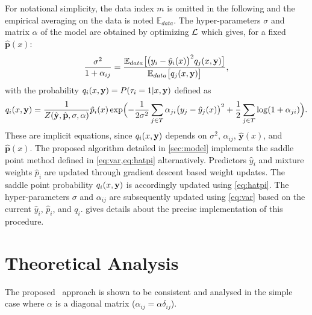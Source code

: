 For notational simplicity, the data index $m$ is omitted in the following and the empirical 
averaging on the data is noted ${\mathbb E}_{data}$. The hyper-parameters $\sigma$ and matrix 
$\alpha$ of the model are obtained by optimizing ${\cal L}$ which gives, for a fixed 
$\hat{\mathbf{p}}(x)$:
%
\begin{equation}\label{eq:var}
  \frac{\sigma^2}{1+\alpha_{ij}} = 
  \frac{
    {\mathbb E}_{data}\bigl[\bigl(y_i-\hat y_i(x)\bigr)^2q_j(x,{\bf y})\bigr]
  }{
    {\mathbb E}_{data}\bigl[q_j(x,{\bf y})\bigr]
  },
\end{equation}
%
with the probability $q_i(x,{\bf y}) = P(\tau_i=1\vert x,{\bf y})$ defined as
%
\begin{equation}\label{eq:hatpi}
  q_i(x,{\bf y}) = \frac{1}{
    Z(\hat {\bf y},\hat{\bf p},\sigma,{\bf \alpha})
  } \hat p_i(x) 
  \exp\Bigl(
    - \frac{1}{2\sigma^2}\sum_{j\in T}\alpha_{ji}\bigl(y_j-\hat y_j(x)\bigr)^2 
    + \frac{1}{2}\sum_{j\in T}\log(1+\alpha_{ji})
  \Bigr).
\end{equation}
%
%
These are implicit equations, since $q_i(x,{\bf y})$ depends on $\sigma^2$, $\alpha_{ij}$, 
$\hat{\mathbf{y}}(x)$, and $\hat{\mathbf{p}}(x)$. The proposed algorithm detailed 
in \cref{sec:model} implements the saddle point method defined in \cref{eq:var,eq:hatpi} 
alternatively. Predictors $\hat y_i$ and mixture weights $\hat p_i$ are updated through 
gradient descent based weight updates. The saddle point probability $q_i(x,{\bf y})$ is accordingly 
updated using \cref{eq:hatpi}. The hyper-parameters $\sigma$ and $\alpha_{ij}$ are subsequently 
updated using \cref{eq:var} based on the current $\hat y_i$, $\hat p_i$, and $q_i$. 
 gives details about the precise implementation of this procedure.


\section{Theoretical Analysis}\label{sec:dtlrtheory}
The proposed \XX\ approach is shown to be consistent and analysed in the simple case where $\alpha$ 
is a diagonal matrix ($\alpha_{ij} = \alpha\delta_{ij}$).

